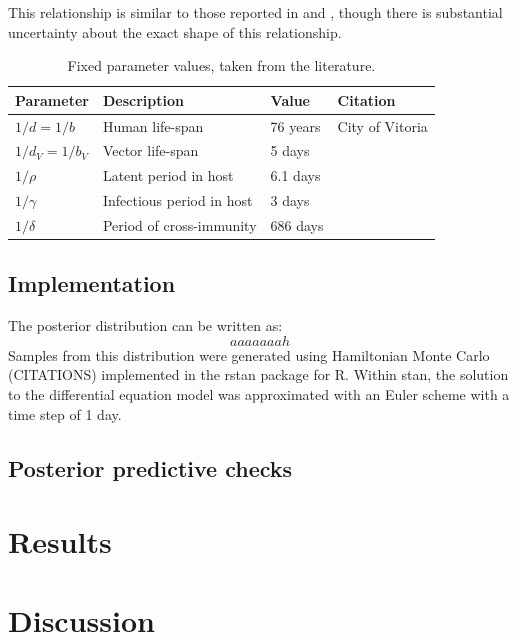 \documentclass[10pt,letterpaper]{article}
\begin{document}
This relationship is similar to those reported in \cite{Focks1995} and \cite{Tjaden2013}, though there is substantial uncertainty about the exact shape of this relationship.

\begin{table}[h]
\begin{center}
\caption{Fixed parameter values, taken from the literature.}
\begin{tabular}{llll}
Parameter & Description & Value & Citation\\
\hline
$1/d = 1/b$ & Human life-span & 76 years & City of Vitoria\\
$1/d_V = 1/b_V$ & Vector life-span & 5 days & \cite{Brady2013} \\
$1/\rho$ & Latent period in host & 6.1 days & \cite{Chan2012}\\
$1/\gamma$ & Infectious period in host & 3 days & \cite{Nguyet2013}\\
$1/\delta$ & Period of cross-immunity & 686 days &  \cite{Reich2013}\\
\end{tabular}
\end{center}
\label{fixedparms}
\end{table}

\subsection*{Implementation}
 
The posterior distribution can be written as:
\begin{equation}
aaaaaaah
\end{equation}
Samples from this distribution were generated using Hamiltonian Monte Carlo (CITATIONS) implemented in the rstan package for R. 
Within stan, the solution to the differential equation model was approximated with an Euler scheme with a time step of 1 day.  

\subsection*{Posterior predictive checks}






\section*{Results}


\section*{Discussion}
\end{document}
